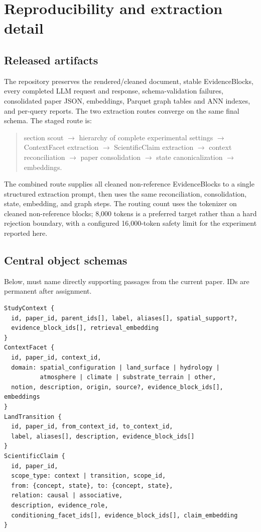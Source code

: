 \section{Reproducibility and extraction detail}

\subsection{Released artifacts}
The repository preserves the rendered/cleaned document, stable EvidenceBlocks, every completed LLM request and response, schema-validation failures, consolidated paper JSON, embeddings, Parquet graph tables and ANN indexes, and per-query reports. The two extraction routes converge on the same final schema. The staged route is:
\begin{quote}\small
section scout $\rightarrow$ hierarchy of complete experimental settings $\rightarrow$ ContextFacet extraction $\rightarrow$ ScientificClaim extraction $\rightarrow$ context reconciliation $\rightarrow$ paper consolidation $\rightarrow$ state canonicalization $\rightarrow$ embeddings.
\end{quote}
The combined route supplies all cleaned non-reference EvidenceBlocks to a single structured extraction prompt, then uses the same reconciliation, consolidation, state, embedding, and graph steps. The routing count uses the  tokenizer on cleaned non-reference blocks; 8,000 tokens is a preferred target rather than a hard rejection boundary, with a configured 16,000-token safety limit for the experiment reported here.

\subsection{Central object schemas}
Below,  must name directly supporting passages from the current paper. IDs are permanent after assignment.
\begin{verbatim}
StudyContext {
  id, paper_id, parent_ids[], label, aliases[], spatial_support?,
  evidence_block_ids[], retrieval_embedding
}
ContextFacet {
  id, paper_id, context_id,
  domain: spatial_configuration | land_surface | hydrology |
          atmosphere | climate | substrate_terrain | other,
  notion, description, origin, source?, evidence_block_ids[], embeddings
}
LandTransition {
  id, paper_id, from_context_id, to_context_id,
  label, aliases[], description, evidence_block_ids[]
}
ScientificClaim {
  id, paper_id,
  scope_type: context | transition, scope_id,
  from: {concept, state}, to: {concept, state},
  relation: causal | associative,
  description, evidence_role,
  conditioning_facet_ids[], evidence_block_ids[], claim_embedding
}
\end{verbatim}

